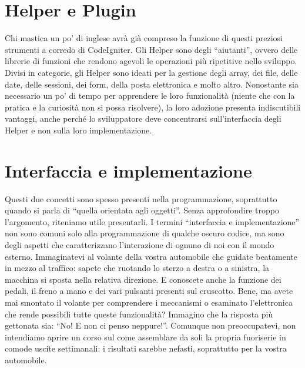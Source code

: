 \section{Helper e Plugin}
\label{cap:helper}

Chi mastica un po' di inglese avrà già compreso la funzione di questi preziosi strumenti a corredo di CodeIgniter. Gli Helper sono degli ``aiutanti'', ovvero delle librerie di funzioni che rendono agevoli le operazioni più ripetitive nello sviluppo. Divisi in categorie, gli Helper sono ideati per la gestione degli array, dei file, delle date, delle sessioni, dei form, della posta elettronica e molto altro. Nonostante sia necessario un po' di tempo per apprendere le loro funzionalità (niente che con la pratica e la curiosità non si possa risolvere), la loro adozione presenta indiscutibili vantaggi, anche perché lo sviluppatore deve concentrarsi sull'interfaccia degli Helper e non sulla loro implementazione.

\section{Interfaccia e implementazione}
Questi due concetti sono spesso presenti nella programmazione, soprattutto quando si parla di ``quella orientata agli oggetti''. Senza approfondire troppo l'argomento, riteniamo utile presentarli. I termini ``interfaccia e implementazione'' non sono comuni solo alla programmazione di qualche oscuro codice, ma sono degli aspetti che caratterizzano l'interazione di ognuno di noi con il mondo esterno. Immaginatevi al volante della vostra automobile che guidate beatamente in mezzo al traffico: sapete che ruotando lo sterzo a destra o a sinistra, la macchina si sposta nella relativa direzione. E conoscete anche la funzione dei pedali, il freno a mano e dei vari pulsanti presenti sul cruscotto. Bene, ma avete mai smontato il volante per comprendere i meccanismi o esaminato l'elettronica che rende possibili tutte queste funzionalità? Immagino che la risposta più gettonata sia: ``No! E non ci penso neppure!''. Comunque non preoccupatevi, non intendiamo aprire un corso sul come assemblare da soli la propria fuoriserie in comode uscite settimanali: i risultati sarebbe nefasti, soprattutto per la vostra automobile.

